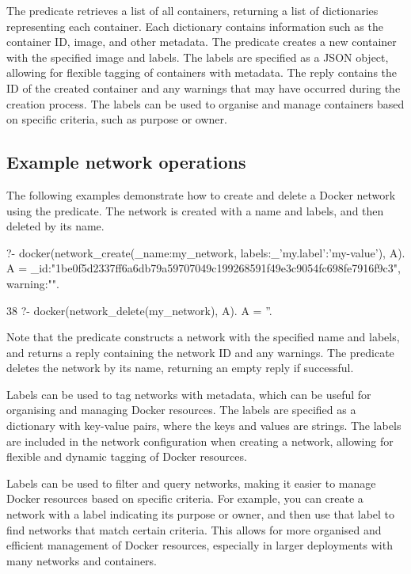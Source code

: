 The  predicate retrieves a list of all containers, returning
a list of dictionaries representing each container. Each dictionary contains
information such as the container ID, image, and other metadata.
The  predicate creates a new container with the specified
image and labels. The labels are specified as a JSON object, allowing for
flexible tagging of containers with metadata. The reply contains the ID of the
created container and any warnings that may have occurred during the creation
process. The labels can be used to organise and manage containers based on
specific criteria, such as purpose or owner.

\subsection{Example network operations}

The following examples demonstrate how to create and delete a Docker network
using the  predicate. The network is created with a name and labels,
and then deleted by its name.

\begin{code}
?- docker(network_create(_{name:my_network, labels:_{'my.label':'my-value'}}), A).
A = _{id:"1be0f5d2337ff6a6db79a59707049c199268591f49e3c9054fc698fe7916f9c3", warning:""}.

38 ?- docker(network_delete(my_network), A).
A = ''.
\end{code}

Note that the  predicate constructs a network with the
specified name and labels, and returns a reply containing the network ID and any
warnings. The  predicate deletes the network by its name,
returning an empty reply if successful.

Labels can be used to tag networks with metadata, which can be useful
for organising and managing Docker resources. The labels are specified
as a dictionary with key-value pairs, where the keys and values are
strings. The labels are included in the network configuration when
creating a network, allowing for flexible and dynamic tagging of Docker
resources.

Labels can be used to filter and query networks, making it easier to
manage Docker resources based on specific criteria. For example, you can
create a network with a label indicating its purpose or owner, and then
use that label to find networks that match certain criteria. This allows
for more organised and efficient management of Docker resources,
especially in larger deployments with many networks and containers.


